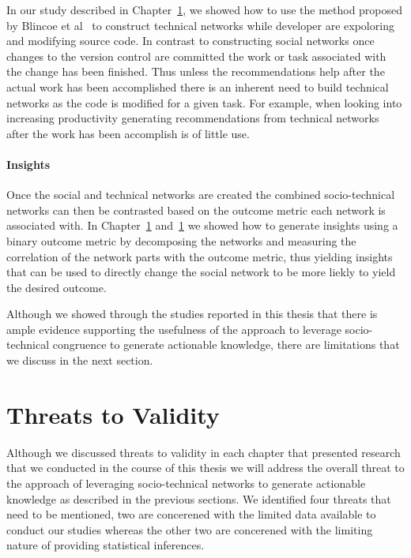 In our study described in Chapter~\ref{}, we showed how to use the method proposed by Blincoe et al~\cite{} to construct technical networks while developer are expoloring and modifying source code.
In contrast to constructing social networks once changes to the version control are committed the work or task associated with the change has been finished.
Thus unless the recommendations help after the actual work has been accomplished there is an inherent need to build technical networks as the code is modified for a given task.
For example, when looking into increasing productivity generating recommendations from technical networks after the work has been accomplish is of little use.

\paragraph{Insights}
Once the social and technical networks are created the combined socio-technical networks can then be contrasted based on the outcome metric each network is associated with.
In Chapter~\ref{} and~\ref{} we showed how to generate insights using a binary outcome metric by decomposing the networks and measuring the correlation of the network parts with the outcome metric, thus yielding insights that can be used to directly change the social network to be more liekly to yield the desired outcome.

Although we showed through the studies reported in this thesis that there is ample evidence supporting the usefulness of the approach to leverage socio-technical congruence to generate actionable knowledge, there are limitations that we discuss in the next section.

\section{Threats to Validity}
Although we discussed threats to validity in each chapter that presented research that we conducted in the course of this thesis we will address the overall threat to the approach of leveraging socio-technical networks to generate actionable knowledge as described in the previous sections.
We identified four threats that need to be mentioned, two are concerened with the limited data available to conduct our studies whereas the other two are concerened with the limiting nature of providing statistical inferences.

